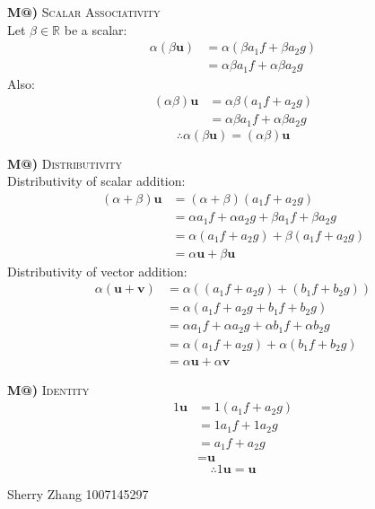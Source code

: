 \documentclass[10pt, letterpaper]{article}
\makeatletter
\newcommand*{\rom}[1]{\expandafter\@slowromancap\romannumeral #1@}
\makeatother
\begin{document}
\textbf{M\rom{2})} \textsc{Scalar Associativity} \\
Let $\beta \in \mathbb{R}$ be a scalar:
\begin{align*}
    \alpha (\beta \textbf{u}) &= \alpha(\beta a_1f + \beta a_2g) \\
    &= \alpha \beta a_1f + \alpha \beta a_2g
\end{align*}
Also:
\begin{align*}
    (\alpha \beta) \textbf{u} &= \alpha \beta (a_1f + a_2g) \\
    &= \alpha \beta a_1f + \alpha \beta a_2g
\end{align*}
\begin{displaymath}
    \therefore \alpha (\beta \textbf{u}) = (\alpha \beta) \textbf{u}
\end{displaymath}

\textbf{M\rom{3})} \textsc{Distributivity} \\
Distributivity of scalar addition:
\begin{align*}
    (\alpha+\beta) \textbf{u} &= (\alpha+\beta)(a_1f + a_2g) \\
    &= \alpha a_1f + \alpha a_2g + \beta a_1f + \beta a_2g \\
    &= \alpha(a_1f + a_2g) + \beta(a_1f + a_2g) \\
    &= \alpha \textbf{u} + \beta \textbf{u}
\end{align*}
Distributivity of vector addition:
\begin{align*}
    \alpha(\textbf{u} + \textbf{v}) &= \alpha((a_1f + a_2g) + (b_1f + b_2g)) \\
    &= \alpha(a_1f + a_2g + b_1f + b_2g) \\
    &= \alpha a_1f + \alpha a_2g + \alpha b_1f + \alpha b_2g \\
    &= \alpha(a_1f + a_2g) + \alpha(b_1f + b_2g) \\
    &= \alpha \textbf{u} + \alpha \textbf{v}
\end{align*}

\textbf{M\rom{4})} \textsc{Identity} \\
\begin{align*}
    1\textbf{u} &= 1(a_1f + a_2g) \\
    &= 1a_1f + 1a_2g \\
    &= a_1f + a_2g \\
    &= \textbf{u}
\end{align*}
\begin{displaymath}
    \therefore 1\textbf{u} = \textbf{u}
\end{displaymath}

Sherry Zhang 1007145297
\end{document}
